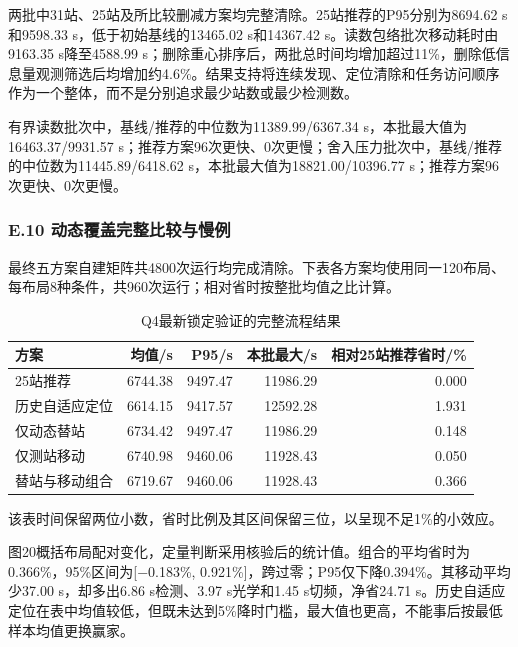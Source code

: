 \documentclass[UTF8,fontset=none,zihao=-4,a4paper]{ctexart}
\begin{document}
两批中31站、25站及所比较删减方案均完整清除。25站推荐的P95分别为8694.62 s和9598.33 s，低于初始基线的13465.02 s和14367.42 s。读数包络批次移动耗时由9163.35 s降至4588.99 s；删除重心排序后，两批总时间均增加超过11\%，删除低信息量观测筛选后均增加约4.6\%。结果支持将连续发现、定位清除和任务访问顺序作为一个整体，而不是分别追求最少站数或最少检测数。

有界读数批次中，基线/推荐的中位数为11389.99/6367.34 s，本批最大值为16463.37/9931.57 s；推荐方案96次更快、0次更慢；舍入压力批次中，基线/推荐的中位数为11445.89/6418.62 s，本批最大值为18821.00/10396.77 s；推荐方案96次更快、0次更慢。

\subsubsection{E.10 动态覆盖完整比较与慢例}\label{e.10-ux52a8ux6001ux8986ux76d6ux5b8cux6574ux6bd4ux8f83ux4e0eux6162ux4f8b}

最终五方案自建矩阵共4800次运行均完成清除。下表各方案均使用同一120布局、每布局8种条件，共960次运行；相对省时按整批均值之比计算。

\begin{table}[H]
\centering\small
\caption{Q4最新锁定验证的完整流程结果}
\begin{tabular}{@{}lrrrr@{}}
\toprule\noalign{}
方案 & 均值/s & P95/s & 本批最大/s & 相对25站推荐省时/\% \\
\midrule\noalign{}

25站推荐 & 6744.38 & 9497.47 & 11986.29 & 0.000 \\
历史自适应定位 & 6614.15 & 9417.57 & 12592.28 & 1.931 \\
仅动态替站 & 6734.42 & 9497.47 & 11986.29 & 0.148 \\
仅测站移动 & 6740.98 & 9460.06 & 11928.43 & 0.050 \\
替站与移动组合 & 6719.67 & 9460.06 & 11928.43 & 0.366 \\
\bottomrule
\end{tabular}
\end{table}

该表时间保留两位小数，省时比例及其区间保留三位，以呈现不足1\%的小效应。

图20概括布局配对变化，定量判断采用核验后的统计值。组合的平均省时为0.366\%，95\%区间为{[}−0.183\%, 0.921\%{]}，跨过零；P95仅下降0.394\%。其移动平均少37.00 s，却多出6.86 s检测、3.97 s光学和1.45 s切频，净省24.71 s。历史自适应定位在表中均值较低，但既未达到5\%降时门槛，最大值也更高，不能事后按最低样本均值更换赢家。
\end{document}
